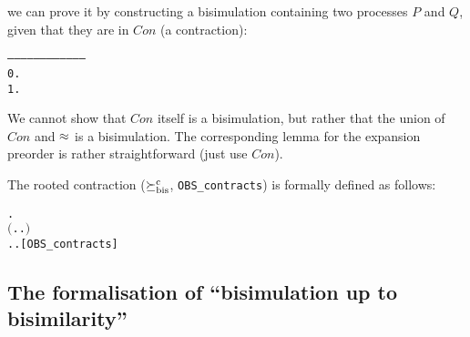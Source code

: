 we can prove it by constructing a bisimulation  containing two processes
$P$ and $Q$, given that they are in $Con$ (a contraction):
\begin{alltt}
   ------------------------------------
    0.  
    1.  
\end{alltt}
We cannot show that $Con$ itself is a bisimulation, but rather
that the union of $Con$ and $\approx$ is a bisimulation.
The corresponding lemma for the expansion preorder is rather
straightforward (just use $Con$).

The rooted contraction ($\mathrel{\succeq^{\rm{c}}_{\rm{bis}}}$, \texttt{OBS_contracts}) is formally
defined as follows:
\begin{alltt}
    \HOLSymConst{\HOLTokenObsContracts}  \HOLSymConst{\HOLTokenDefEquality{}}
     \HOLSymConst{\HOLTokenForall{}}.
         \ensuremath{(}\HOLSymConst{\HOLTokenForall{}}.  \HOLTokenTransBegin{}\HOLTokenTransEnd {} \HOLSymConst{\HOLTokenImp{}} \HOLSymConst{\HOLTokenExists{}}.  \HOLTokenTransBegin{}\HOLTokenTransEnd {} \HOLSymConst{\HOLTokenConj{}}  \HOLSymConst{\HOLTokenContracts{}} \ensuremath{)} \HOLSymConst{\HOLTokenConj{}}
         \HOLSymConst{\HOLTokenForall{}}.  \HOLTokenTransBegin{}\HOLTokenTransEnd {} \HOLSymConst{\HOLTokenImp{}} \HOLSymConst{\HOLTokenExists{}}.  \HOLTokenWeakTransBegin{}\HOLTokenWeakTransEnd {} \HOLSymConst{\HOLTokenConj{}}  \HOLSymConst{\HOLTokenWeakEQ} \hfill{[OBS_contracts]}
\end{alltt}

\subsection{The formalisation of ``bisimulation up to bisimilarity''}

